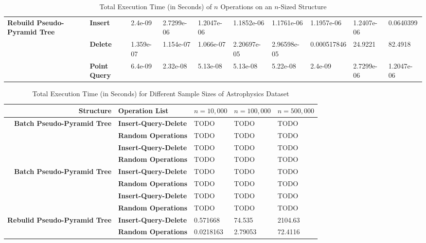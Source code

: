 \begin{landscape}
\begin{table}
\begin{tabular}{|p{2cm}|l|l|l|l|l|l|l|l|l|}
			\hline
			\multirow{ 4}{*}{\textbf{Rebuild Pseudo-Pyramid Tree}}
			& \textbf{Insert} & 2.4e-09 & 2.7299e-06 & 1.2047e-06 & 1.1852e-06 & 1.1761e-06 & 1.1957e-06 & 1.2407e-06 & 0.0640399 \\
			& \textbf{Delete} & 1.359e-07 & 1.154e-07 & 1.066e-07 & 2.20697e-05 & 2.96598e-05 & 0.000517846 & 24.9221 & 82.4918 \\
			& \textbf{Point Query} & 6.4e-09 & 2.32e-08 & 5.13e-08 & 5.13e-08 & 5.22e-08 & 2.4e-09 & 2.7299e-06 & 1.2047e-06 \\
			\hline
		\end{tabular}
		\caption{Total Execution Time (in Seconds) of $n$ Operations on an $n$-Sized Structure}
		\label{tab:perf1-sizevary}
	\end{table}

\end{landscape}

\begin{table}
	\centering
	\begin{tabular}{|r|l|l|l|l|}
		\hline
		\textbf{Structure} & \textbf{Operation List} & $n = 10,000$ & $n = 100,000$ & $n = 500,000$ \\
		\hline
		\multirow{ 3}{*}{\textbf{Batch Pseudo-Pyramid Tree}} & \textbf{Insert-Query-Delete} & TODO & TODO & TODO \\
		 & \textbf{Random Operations} & TODO & TODO & TODO \\
		\hline
		\multirow{ 3}{*}{\textbf{Octree}} & \textbf{Insert-Query-Delete} & TODO & TODO & TODO \\
		 & \textbf{Random Operations} & TODO & TODO & TODO \\
		\hline
		\multirow{ 3}{*}{\textbf{Batch Pseudo-Pyramid Tree}} & \textbf{Insert-Query-Delete} & TODO & TODO & TODO \\
		 & \textbf{Random Operations} & TODO & TODO & TODO \\
		\hline
		\multirow{ 3}{*}{\textbf{Defragmented Pseudo-Pyramid Tree}} & \textbf{Insert-Query-Delete} & TODO & TODO & TODO \\
		 & \textbf{Random Operations} & TODO & TODO & TODO \\
		\hline
		\multirow{ 3}{*}{\textbf{Rebulid Pseudo-Pyramid Tree}} & \textbf{Insert-Query-Delete} &  0.571668 & 74.535 & 2104.63 \\
		 & \textbf{Random Operations} & 0.0218163 & 2.79053 & 72.4116 \\
		\hline		
	\end{tabular}
	\caption{Total Execution Time (in Seconds) for Different Sample Sizes of Astrophysics Dataset}
	\label{tab:perf1-astrophysics}
	\end{table}	

